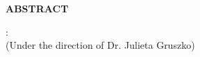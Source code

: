 \begin{center}
\vspace*{52pt}
{\normalfont\textbf{ABSTRACT}}
\vspace{11pt}

\begin{singlespace}
{\authorname}: {\thesistitle}\\
(Under the direction of Dr. Julieta Gruszko)
\end{singlespace}
\end{center}



